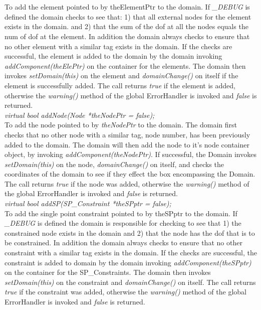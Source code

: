   \\
  \\
To add the element pointed to by theElementPtr to the domain. 
If {\em \_DEBUG} is defined the domain checks to
see that: 1) that all external nodes for the element exists in the
domain. and 2) that the sum of the dof at all the nodes equals the num
of dof at the element. In addition the domain always checks to ensure
that no other element with a similar tag exists in the domain.
If the checks are successful, the element is added to
the domain by the domain invoking {\em addComponent(theElePtr)} on
the container for the elements. The domain then invokes {\em
setDomain(this)} on the element and {\em domainChange()} on
itself if the element is successfully added. The call returns {\em
true} if the element is added, otherwise the {\em warning()} method of
the global ErrorHandler is invoked and {\em false} is returned.\\

{\em virtual bool addNode(Node *theNodePtr = false);}  \\
To add the node pointed to by {\em theNodePtr} to the domain. 
The domain first checks that no other node with a similar tag,
node number, has been previously added to the domain. The
domain will then add the node to it's node container object, by
invoking {\em addComponent(theNodePtr)}. If successful, the Domain
invokes {\em setDomain(this)} on the node, {\em domainChange()} on
itself, and checks the coordinates of the domain to see if they effect
the box encompassing the Domain. The call returns {\em true} if the
node was added, otherwise the {\em warning()} method of
the global ErrorHandler is invoked and {\em false} is returned.\\


{\em virtual bool addSP(SP\_Constraint *theSPptr = false);}  \\
To add the single point constraint pointed to by theSPptr to the
domain. If {\em \_DEBUG} is defined the domain is responsible for
checking to see that 1) the constrained node exists in the domain and
2) that the node has the dof that is to be constrained. 
In addition the domain always checks to ensure that no other
constraint with a similar tag exists in the domain. If the checks are
successful, the constraint is added to domain by the domain invoking {\em
addComponent(theSPptr)} on the container for the SP\_Constraints. The
domain then invokes {\em setDomain(this)} on the 
constraint and {\em domainChange()} on itself. The call returns {\em
true} if the constraint was added, otherwise the {\em warning()} method of
the global ErrorHandler is invoked and {\em false} is returned.\\



